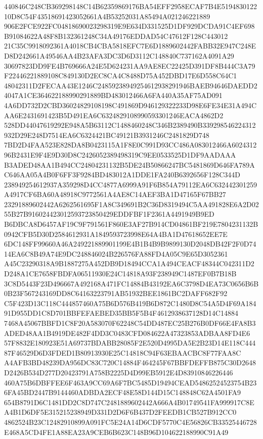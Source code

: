 \documentclass[UTF8,fontset=fandol,zihao=-4,a4paper]{ctexart}
\begin{document}
{{440846C248CB369298148C14B62359869176BA54EFF2958ECAF7B4E519483012210D8C54F43518691423052661A4B53252031A85494A021246221889
906E2FCE922FC04818690023298319E9E634D331525D1DF929DCDA91C4EF698B91084622A48F8B132361248C34A49176EDDAD54C47612F128C443012
21C35C9918092361A4018CB4CBA5818EFC7E6D1889602442FABB32E947C248ED8D242661A49546AA4B23AFA3DC3D6D3112C148840C737162A4091A29
30697823DD9FE4B769666A24E5D624231AA9AE8EC22425D391DF8B444C3A79F22446221889108C849130D2EC8CA4C8488D75A452DBD17E6D558C64C1
48042311D2FECAA43E1246C24859238949254612938291946BAEB94646DAEDD24047A1CE364622188990291889BD483012466A6FA440A35AF75AD091
4A6DD732D2CBD36024829108198C491869D946129322233D98E6FE34E31A494CAA6E2431691423B5D491EA6C6324829108990593301246EACA4862D2
528DD44047619292E948A5B63112C1488460248C346B2389490B339298546224312932D29E248D7514EA6C6324421BC49121B3931246C2481829D748
7BD2D4FAA523E828DA8B0423115A1F8E0C991D93CC486A083012466A602431296B2431E9F4E9D30D8C2426052389498319C9EE0533525D1DF9AADAAA
B3ADED48AA1B494CC24804231132B5DE24B50866247BC5481869D646FA789AC646AA05A4B0F6FF3F9284BD483012A1DDE1FA240B6392656F128C344D
238949254612937A359298D4CC4877A6999A91F6B854A79112EA6C632442301259A4917CF6BA60A48918C9772561A4AE8C14AEF3BA1D47165F67BB27
23291889602442A6262561695F1A8C349691B2C36D8319494C5AA491828E6A2D0255B27B916024423012593723850429EDDFBF1F2361A4491949B9ED
B6DBCA8D6457AF19C9F791561F860E3AF27B914CD04861BF219E7804231132B0942CFB5D30D2584612931A1849593723998E64A4BA1D47618652EE7E
6DC148FF99660A46A249221889901199E4B1B4B9B9899130D2048DB42F2F0D7414EA6C8B49A74E9DC248846024B226576FA88FD4A05C9E65D3052361
A45C23290318A9B1887275A452DB9D18494CCA1A494CEACF48344C042311D2D248A1CE7658FBDFA06511930E24C14818A93F238949C1487EF0B7B18B
3C8D5443F23D496667A492168A471FC14884B43192EA6C3798D4EA73C0656B6B0B23F567243169DD8C64163223791AB51932BEE1861BC2DAFF682F92
C5F423D13C118C444857460A75B6D576B419B6D872C1480D8C54A5D4F69A18491D955DD1C8D701BBFEFAEBED35BB5F5B4F4612938637128D14C14884
7468A45067BBFD1C8F20A583070F62248C54DD487EC25B276B0DF66E4FA8B3ADED48AA1B4919DE482F4DD3C0483CFD084622A47323853ADBAA8FD4E6
57F8832E180923E51A69737BDABB28085F2E520D4995DA5E2B23D14E118C44487F46529D6D3FDED1B80913930E25C14818C94F63EBAACBC8F77FAA8C
A4AFB3BD48239DA956DC83C720C14884F464245F67BBFDEFFB875C30D2648D2426B534D277D20423791A758B2225D4D99EB5912E4D83910846226446
460A75B6DBFFEE6F463A9CC69A6F7BC5485D19494CEAD54862524523754B236FA45BD2447B9144460ADBDA2ECF48E58D144D15C148848C62A4501FA9
654B8791D6C1481DD2C8D747C2481889602442A666A4B01749541FA999917C8EA4B1D6DF5E315215238949D331D2D6F6B437D2FEEDB1CB527B912CC0
4862524B23C12482910899A091FC5E24A14D6CDF5770C4E56826CB33525446728E468A5CD4FE1A88EA23A9CEB6B623C148B96D104622188990C91A49
}}
\end{document}

